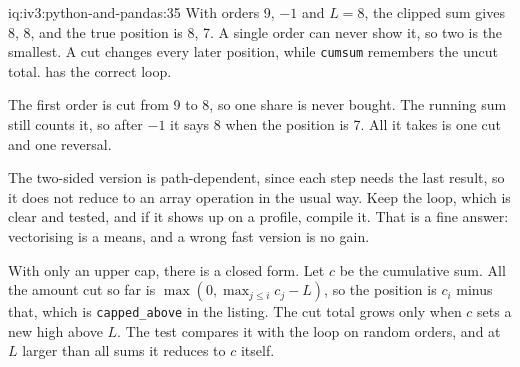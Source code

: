 \begin{solution}{iq:iv3:python-and-pandas:35}
With orders 9, $-1$ and $L = 8$, the clipped sum gives 8, 8, and the true position is 8, 7. A single order can never show it, so two is the smallest. A cut changes every later position, while \texttt{cumsum} remembers the uncut total.  has the correct loop.
\label{lst:iv3:pp:position}

The first order is cut from 9 to 8, so one share is never bought. The running sum still counts it, so after $-1$ it says 8 when the position is 7. All it takes is one cut and one reversal.

The two-sided version is path-dependent, since each step needs the last result, so it does not reduce to an array operation in the usual way. Keep the loop, which is clear and tested, and if it shows up on a profile, compile it. That is a fine answer: vectorising is a means, and a wrong fast version is no gain.

With only an upper cap, there is a closed form. Let $c$ be the cumulative sum. All the amount cut so far is $\max(0, \max_{j \le i} c_j - L)$, so the position is $c_i$ minus that, which is \texttt{capped\_above} in the listing. The cut total grows only when $c$ sets a new high above $L$. The test compares it with the loop on random orders, and at $L$ larger than all sums it reduces to $c$ itself.

\end{solution}

